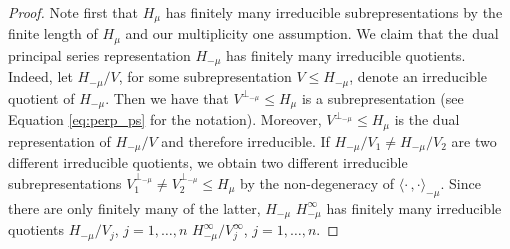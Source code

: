 \documentclass[JEP,XML,SOM,NoFloatCountersInSection,Unicode,published]{cedram}
\theoremstyle{definition}
\newcommand{\ps}[2]{\ensuremath{H_{#2}}}
\newcommand{\pss}[2]{\ensuremath{H_{#2}^\infty}}
\begin{document}
\begin{proof}
Note first that $\ps{\sigma}{\mu}$ has finitely many irreducible subrepresentations by the finite length of $\ps{\sigma}{\mu}$ and our multiplicity one assumption. We claim that the dual principal series representation $\ps{\tilde\sigma}{-\mu}$ has finitely many irreducible quotients. Indeed, let $\ps{\tilde\sigma}{-\mu}/V$, for some subrepresentation $V\leq\ps{\tilde\sigma}{-\mu}$, denote an irreducible quotient of $\ps{\tilde\sigma}{-\mu}$. Then we have that $V^{\perp_{-\mu}}\leq\ps{\sigma}{\mu}$ is a subrepresentation (see Equation \eqref{eq:perp_ps} for the notation). Moreover, $V^{\perp_{-\mu}}\leq\ps{\sigma}{\mu}$ is the dual representation of $\ps{\tilde\sigma}{-\mu}/V$ and therefore irreducible. If $\ps{\tilde\sigma}{-\mu}/V_1\neq\ps{\tilde\sigma}{-\mu}/V_2$ are two different irreducible quotients, we obtain two different irreducible subrepresentations $V_1^{\perp_{-\mu}}\neq V_2^{\perp_{-\mu}}\leq\ps{\sigma}{\mu}$ by the non-degeneracy of $\langle\cdot\,,\cdot\rangle_{-\mu}$. Since there are only finitely many of the latter, $\ps{\tilde\sigma}{-\mu}$ \resp $\pss{\tilde\sigma}{-\mu}$ has finitely many irreducible quotients $\ps{\tilde\sigma}{-\mu}/V_j$, $j=1,\ldots,n$ \resp $\pss{\tilde\sigma}{-\mu}/V_j^\infty$, $j=1,\ldots,n$.


\end{proof}
\end{document}

